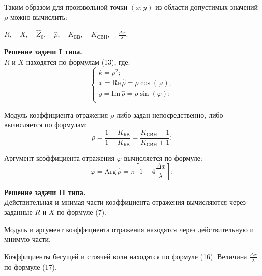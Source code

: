 \documentclass[12pt,a4paper]{article}
\newcommand{\ds}{\displaystyle}
\newcommand{\im}{\mathrm{Im}}
\newcommand{\re}{\mathrm{Re}}
\renewcommand{\arg}{\mathrm{Arg}}
\newcommand{\ro}{\hat{\rho}}
\newcommand{\zz}{\hat{Z}_0}
\newcommand{\kb}{K_{\text{БВ}}}
\newcommand{\ks}{K_{\text{СВН}}}
\newcommand{\dxl}{\displaystyle\frac{\Delta x}{\lambda}}
\begin{document}
	Таким образом для произвольной точки $(x;y)$ из области допустимых значений $\rho$ можно вычислить:
	\begin{center}
		$R, \quad X, \quad \zz, \quad \ro, \quad \kb, \quad \ks, \quad \dxl.$
	\end{center}
	
	\textbf{Решение задачи I типа.} \\
	$R$ и $X$ находятся по формулам (13), где:
	\begin{equation}
		\begin{cases}
			k = \rho^2; \\[5pt]
			x = \re\,\ro = \rho \cos(\varphi); \\[5pt]
			y = \im\,\ro = \rho \sin(\varphi); \\
		\end{cases}
	\end{equation}
	
	Модуль коэффициента отражения $\rho$ либо задан непосредственно, либо вычисляется по формулам:
	\begin{equation}
		\ds \rho = \frac{1-\kb}{1-\kb} = \frac{\ks-1}{\ks+1};
	\end{equation}
	
	Аргумент коэффициента отражения $\varphi$ вычисляется по формуле:
	\begin{equation}
		\varphi = \arg\,\ro = \pi \left[ 1 - 4\dxl \right];
	\end{equation}
	
	\textbf{Решение задачи II типа.} \\
	Действительная и мнимая части коэффициента отражения вычисляются через заданные $R$ и $X$
	по формуле (7).
	
	Модуль и аргумент коэффициента отражения находятся через действительную и мнимую части.
	
	Коэффициенты бегущей и стоячей волн находятся по формуле (16). Величина $\dxl$ по формуле (17).
\end{document}

